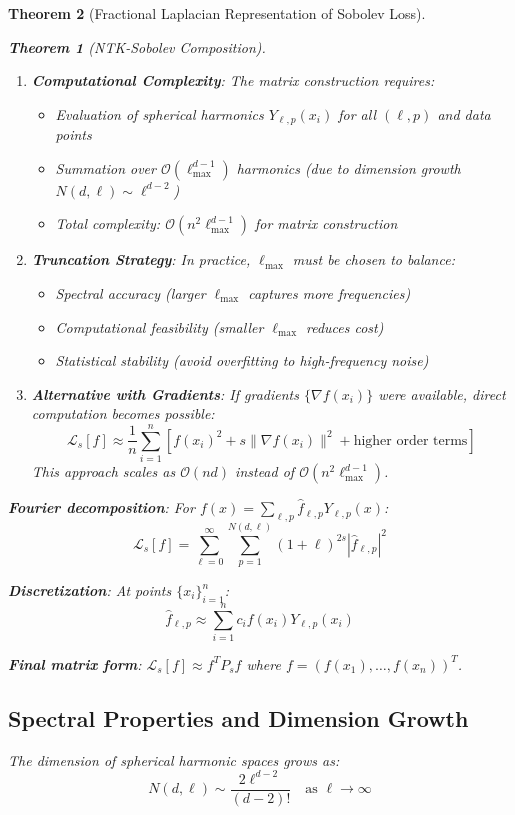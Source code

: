 \documentclass{article}
\newtheorem{theorem}{Theorem}[section]
\begin{document}
\begin{theorem}[Fractional Laplacian Representation of Sobolev Loss]
\begin{theorem}[NTK-Sobolev Composition]
\begin{enumerate}
\item \textbf{Computational Complexity}: The matrix construction requires:
\begin{itemize}
\item Evaluation of spherical harmonics $Y_{\ell,p}(x_i)$ for all $(\ell,p)$ and data points
\item Summation over $\mathcal{O}(\ell_{\max}^{d-1})$ harmonics (due to dimension growth $N(d,\ell) \sim \ell^{d-2}$)
\item Total complexity: $\mathcal{O}(n^2 \ell_{\max}^{d-1})$ for matrix construction
\end{itemize}

\item \textbf{Truncation Strategy}: In practice, $\ell_{\max}$ must be chosen to balance:
\begin{itemize}
\item Spectral accuracy (larger $\ell_{\max}$ captures more frequencies)
\item Computational feasibility (smaller $\ell_{\max}$ reduces cost)
\item Statistical stability (avoid overfitting to high-frequency noise)
\end{itemize}

\item \textbf{Alternative with Gradients}: If gradients $\{\nabla f(x_i)\}$ were available, direct computation becomes possible:
\[ \mathcal{L}_s[f] \approx \frac{1}{n}\sum_{i=1}^n \left[ f(x_i)^2 + s \|\nabla f(x_i)\|^2 + \text{higher order terms} \right] \]
This approach scales as $\mathcal{O}(nd)$ instead of $\mathcal{O}(n^2\ell_{\max}^{d-1})$.
\end{enumerate}

\textbf{Fourier decomposition}: For $f(x) = \sum_{\ell,p} \hat{f}_{\ell,p} Y_{\ell,p}(x)$:
\[ \mathcal{L}_s[f] = \sum_{\ell=0}^{\infty} \sum_{p=1}^{N(d,\ell)} (1+\ell)^{2s} |\hat{f}_{\ell,p}|^2 \]

\textbf{Discretization}: At points $\{x_i\}_{i=1}^n$:
\[ \hat{f}_{\ell,p} \approx \sum_{i=1}^n c_i f(x_i) Y_{\ell,p}(x_i) \]

\textbf{Final matrix form}: $\mathcal{L}_s[f] \approx f^T P_s f$ where $f = (f(x_1), \ldots, f(x_n))^T$.

\subsection{Spectral Properties and Dimension Growth}

The dimension of spherical harmonic spaces grows as:
\[ N(d,\ell) \sim \frac{2\ell^{d-2}}{(d-2)!} \quad \text{as } \ell \to \infty \]


\end{theorem}
\end{theorem}
\end{document}

